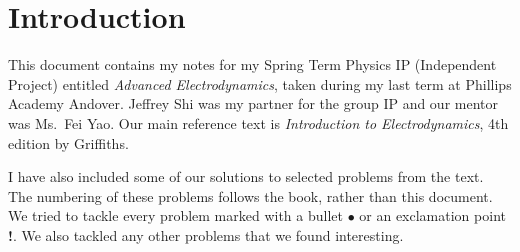 \chapter*{Introduction}

This document contains my notes for my Spring Term Physics IP (Independent Project) entitled \textit{Advanced Electrodynamics}, taken during my last term at Phillips Academy Andover. Jeffrey Shi was my partner for the group IP and our mentor was Ms.~Fei Yao. Our main reference text is \textit{Introduction to Electrodynamics}, 4th edition by Griffiths.

I have also included some of our solutions to selected problems from the text. The numbering of these problems follows the book, rather than this document. We tried to tackle every problem marked with a bullet $\bullet$ or an exclamation point \textbf{!}. We also tackled any other problems that we found interesting.